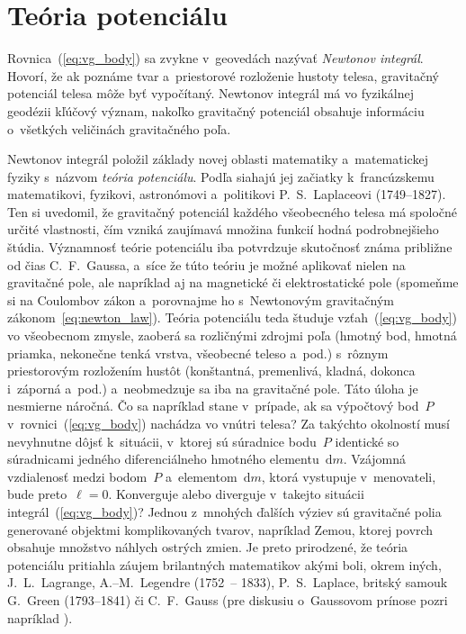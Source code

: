 \documentclass[a4paper,12pt]{book}
\newcommand{\diff}{\mathrm d}
\begin{document}
\section{Teória potenciálu}
\label{sec:potential_theory}

Rovnica~(\ref{eq:vg_body}) sa zvykne v~geovedách nazývať \emph{Newtonov
integrál}.  Hovorí, že ak poznáme tvar a~priestorové rozloženie hustoty telesa,
gravitačný potenciál telesa môže byť vypočítaný.  Newtonov
integrál má vo fyzikálnej geodézii kľúčový význam, nakoľko gravitačný potenciál 
obsahuje informáciu o~všetkých veličinách gravitačného poľa.

Newtonov integrál položil základy novej oblasti matematiky a~matematickej 
fyziky s~názvom \emph{teória potenciálu}.  Podľa \textcite{MacMillan1930} 
siahajú jej začiatky k~francúzskemu matematikovi, fyzikovi, astronómovi 
a~politikovi P.~S.~Laplaceovi (1749--1827).  Ten si uvedomil, že gravitačný 
potenciál každého všeobecného telesa má spoločné určité vlastnosti, čím vzniká 
zaujímavá množina funkcií hodná podrobnejšieho štúdia.  Významnosť teórie 
potenciálu iba potvrdzuje skutočnosť známa približne od čias C.~F.~Gaussa, 
a~síce že túto teóriu je možné aplikovať nielen na gravitačné pole, ale 
napríklad aj na magnetické či elektrostatické pole (spomeňme si na Coulombov 
zákon a~porovnajme ho s~Newtonovým gravitačným zákonom~\ref{eq:newton_law}).  
Teória potenciálu teda študuje vzťah~(\ref{eq:vg_body}) vo všeobecnom zmysle, 
zaoberá sa rozličnými zdrojmi poľa (hmotný bod, hmotná priamka, nekonečne tenká 
vrstva, všeobecné teleso a~pod.) s~rôznym priestorovým rozložením hustôt 
(konštantná, premenlivá, kladná, dokonca i~záporná a~pod.) a~neobmedzuje sa iba 
na gravitačné pole.  Táto úloha je nesmierne náročná.  Čo sa napríklad stane 
v~prípade, ak sa výpočtový bod~$P$ v~rovnici~(\ref{eq:vg_body}) nachádza vo 
vnútri telesa?  Za takýchto okolností musí nevyhnutne dôjsť k~situácii, 
v~ktorej sú súradnice bodu~$P$ identické so súradnicami jedného diferenciálneho 
hmotného elementu~$\diff m$.  Vzájomná vzdialenosť medzi bodom~$P$ 
a~elementom~$\diff m$, ktorá vystupuje v~menovateli, bude preto~$\ell = 0$.  
Konverguje alebo diverguje v~takejto situácii integrál~(\ref{eq:vg_body})?  
Jednou z~mnohých ďalších výziev sú gravitačné polia generované objektmi 
komplikovaných tvarov, napríklad Zemou, ktorej povrch obsahuje množstvo náhlych 
ostrých zmien.  Je preto prirodzené, že teória potenciálu pritiahla záujem 
brilantných matematikov akými boli, okrem iných, J.~L.~Lagrange, 
A.--M.~Legendre (1752~-- 1833), P.~S.~Laplace, britský samouk G.~Green 
(1793--1841) či C.~F.~Gauss (pre diskusiu o~Gaussovom prínose pozri napríklad 
\cite{Freeden2018}).
\end{document}
